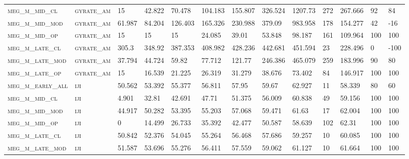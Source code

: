 \begin{landscape}
\begin{center}
\begin{footnotesize}
\begin{longtable}{lllllllllllll}
\textsc{meg\_m\_mid\_cl   } & \textsc{gyrate\_am}   & 15       & 42.822   & 70.478   & 104.183  & 155.807  & 326.524  & 1207.73  & 272    & 267.666       & 92            & 84              \\
\textsc{meg\_m\_mid\_mod  } & \textsc{gyrate\_am}   & 61.987   & 84.204   & 126.403  & 165.326  & 230.988  & 379.09   & 983.958  & 178    & 154.277       & 42            & -16             \\
\textsc{meg\_m\_mid\_op   } & \textsc{gyrate\_am}   & 15       & 15       & 15       & 24.085   & 39.01    & 53.848   & 98.187   & 161    & 109.964       & 100           & 100             \\
\textsc{meg\_m\_late\_cl  } & \textsc{gyrate\_am}   & 305.3    & 348.92   & 387.353  & 408.982  & 428.236  & 442.681  & 451.594  & 23     & 228.496       & 0             & -100            \\
\textsc{meg\_m\_late\_mod } & \textsc{gyrate\_am}   & 37.794   & 44.724   & 59.82    & 77.712   & 121.77   & 246.386  & 465.079  & 259    & 183.996       & 90            & 80              \\
\textsc{meg\_m\_late\_op  } & \textsc{gyrate\_am}   & 15       & 16.539   & 21.225   & 26.319   & 31.279   & 38.676   & 73.402   & 84     & 146.917       & 100           & 100             \\
\textsc{meg\_m\_early\_all} & \textsc{iji       }   & 50.562   & 53.392   & 55.377   & 56.811   & 57.95    & 59.67    & 62.927   & 11     & 58.339        & 80            & 60              \\
\textsc{meg\_m\_mid\_cl   } & \textsc{iji       }   & 4.901    & 32.81    & 42.691   & 47.71    & 51.375   & 56.009   & 60.838   & 49     & 59.156        & 100           & 100             \\
\textsc{meg\_m\_mid\_mod  } & \textsc{iji       }   & 44.917   & 50.282   & 53.395   & 55.203   & 57.068   & 59.471   & 61.63    & 17     & 62.004        & 100           & 100             \\
\textsc{meg\_m\_mid\_op   } & \textsc{iji       }   & 0        & 14.499   & 26.733   & 35.392   & 42.477   & 50.587   & 58.639   & 102    & 62.31         & 100           & 100             \\
\textsc{meg\_m\_late\_cl  } & \textsc{iji       }   & 50.842   & 52.376   & 54.045   & 55.264   & 56.468   & 57.686   & 59.257   & 10     & 60.085        & 100           & 100             \\
\textsc{meg\_m\_late\_mod } & \textsc{iji       }   & 51.587   & 53.696   & 55.276   & 56.411   & 57.559   & 59.062   & 61.127   & 10     & 61.664        & 100           & 100             \\

\end{longtable}
\end{footnotesize}
\end{center}
\end{landscape}

